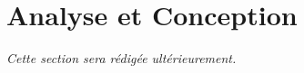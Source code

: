 \chapter{Analyse et Conception}
\label{chap:analyse}
\textit{Cette section sera rédigée ultérieurement.}
